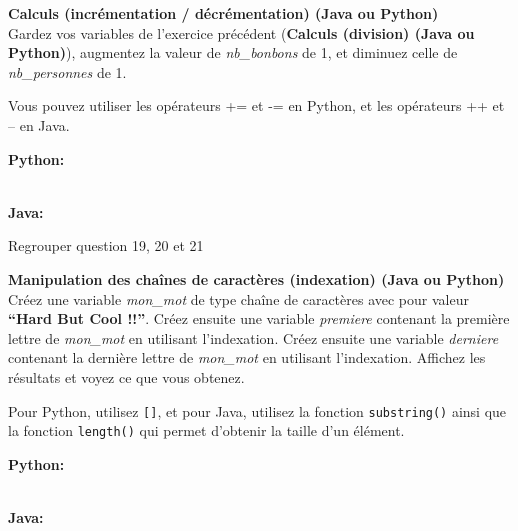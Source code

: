 \begin{Exercice}[5 minutes] \textbf{Calculs (incrémentation / décrémentation) (Java ou Python)}\\
   Gardez vos variables de l'exercice précédent (\textbf{Calculs (division) (Java ou Python)}), augmentez la valeur de \textit{nb\_bonbons} de 1, et diminuez celle de \textit{nb\_personnes} de 1.  \\
   
    \begin{conseil}
      	Vous pouvez utiliser les opérateurs += et -= en Python, et les opérateurs ++ et -- en Java.
        
    \end{conseil}
    \begin{solution}
    
    \textbf{Python:}
    
    
    \textbf{\\Java:}
    
           
    \end{solution}   
\end{Exercice}

Regrouper question 19, 20 et 21
\begin{Exercice}[5 minutes] \textbf{Manipulation des chaînes de caractères (indexation) (Java ou Python)}\\
   Créez une variable \textit{mon\_mot} de type chaîne de caractères avec pour valeur \textbf{``Hard But Cool !!''}. Créez ensuite une variable \textit{premiere} contenant la première lettre de \textit{mon\_mot} en utilisant l'indexation. Créez ensuite une variable \textit{derniere} contenant la dernière lettre de \textit{mon\_mot} en utilisant l'indexation. Affichez les résultats et voyez ce que vous obtenez. \\
   
    \begin{conseil}
      	Pour Python, utilisez \lstinline{[]}, et pour Java, utilisez la fonction \lstinline{substring()} ainsi que la fonction \lstinline{length()} qui permet d'obtenir la taille d'un élément.
        
    \end{conseil}
    \begin{solution}
    
    \textbf{Python:}
    
    
    \textbf{\\Java:}
    
           
    \end{solution}   
\end{Exercice}

